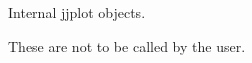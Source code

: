 \begin{Description}\relax
Internal jjplot objects.
\end{Description}
\begin{Details}\relax
These are not to be called by the user.
\end{Details}


